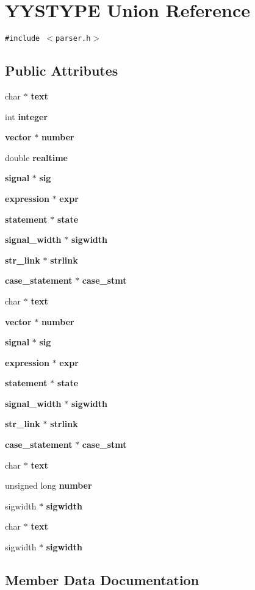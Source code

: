\section{YYSTYPE  Union Reference}
\label{unionYYSTYPE}
{\tt \#include $<$parser.h$>$}

\subsection*{Public Attributes}
\begin{CompactItemize}
\item 
char $\ast$ {\bf text}
\item 
int {\bf integer}
\item 
{\bf vector} $\ast$ {\bf number}
\item 
double {\bf realtime}
\item 
{\bf signal} $\ast$ {\bf sig}
\item 
{\bf expression} $\ast$ {\bf expr}
\item 
{\bf statement} $\ast$ {\bf state}
\item 
{\bf signal\_\-width} $\ast$ {\bf sigwidth}
\item 
{\bf str\_\-link} $\ast$ {\bf strlink}
\item 
{\bf case\_\-statement} $\ast$ {\bf case\_\-stmt}
\item 
char $\ast$ {\bf text}
\item 
{\bf vector} $\ast$ {\bf number}
\item 
{\bf signal} $\ast$ {\bf sig}
\item 
{\bf expression} $\ast$ {\bf expr}
\item 
{\bf statement} $\ast$ {\bf state}
\item 
{\bf signal\_\-width} $\ast$ {\bf sigwidth}
\item 
{\bf str\_\-link} $\ast$ {\bf strlink}
\item 
{\bf case\_\-statement} $\ast$ {\bf case\_\-stmt}
\item 
char $\ast$ {\bf text}
\item 
unsigned long {\bf number}
\item 
sigwidth $\ast$ {\bf sigwidth}
\item 
char $\ast$ {\bf text}
\item 
sigwidth $\ast$ {\bf sigwidth}
\end{CompactItemize}


\subsection{Member Data Documentation}
